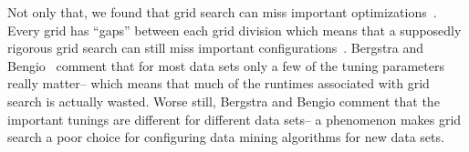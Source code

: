 \documentclass[smallextended]{svjour3}
\begin{document}
Not only that, we found that grid search can miss
important optimizations~\cite{baker07}.
Every grid has ``gaps'' between each grid division which means
that a supposedly rigorous grid search can still miss
important configurations~\cite{Bergstra2012}. 
Bergstra and Bengio~\cite{Bergstra2012} comment that for most data sets only a few of the tuning parameters really matter-- which means that
much of the runtimes associated with grid search is actually wasted.
Worse still, Bergstra and Bengio  comment that 
the 
important tunings are   different   for different
data sets-- a 
 phenomenon makes grid search a poor choice for configuring data mining
 algorithms for new data sets. 
 



 






\end{document}
